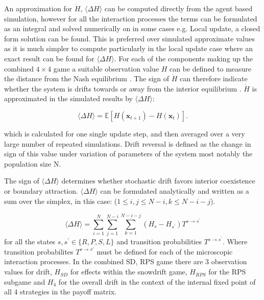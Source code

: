 \documentclass[%
 reprint,
 amsmath,amssymb,
 aps,
]{revtex4-2}
\begin{document}
An approximation for $\dot{H}$, $\langle \Delta H \rangle$ can be computed directly from the 
agent based simulation, however for all the interaction processes the terms can be 
formulated as an integral and solved numerically on in some cases e.g. Local update, a 
closed form solution can be found. This is preferred over simulated approximate values as it is much 
simpler to compute particularly in the local update case where an exact result can be found 
for $\langle \Delta H \rangle$. 
For each of the components making up the combined $4 \times 4$ game a suitable observation
value $H$ can be defined to measure the distance from the Nash equilibrium 
\cite{drift_reversal_paper,rps_cyclic_jens}. The sign of $\dot{H}$ can therefore
indicate whether the system is drifts towards or away from the interior equilibrium \cite{drift_reversal_paper}.
$\dot{H}$ is approximated in the simulated results by $\langle \Delta H \rangle$:

\begin{equation}
\langle \Delta H \rangle = \mathbb{E}[H(\mathbf{x}_{t+1}) - H(\mathbf{x}_t)].
\end{equation}

which is calculated for one single update step, and then averaged over a very large number of 
repeated simulations. Drift reversal is defined as the change in sign of this value under
variation of parameters of the system most notably the population size N. 

The sign of $\langle \Delta H \rangle$ determines whether stochastic drift favors interior coexistence or boundary attraction.
$\langle \Delta H \rangle$ can be formulated analytically \cite{rps_cyclic_jens} and
written as a sum over the simplex, in this case:
($1 \le i, j \le N -i, k \le N - i - j$).

\begin{equation}
\langle \Delta H \rangle = \sum_{i=1}^{N} \sum_{j=1}^{N-i} 
\sum_{k=1}^{N-i-j} \left(H_{s} - H_{s^\prime}\right)T^{s
\rightarrow s^\prime}
\end{equation}
for all the states $s, s^\prime \in \{R, P, S, L\}$ and transition probabilities $T^{s \rightarrow s^\prime}$.
Where transition probabilites $T^{s \rightarrow s'}$ must be defined for each of the 
microscopic interaction processes. In the combined SD, RPS game there are 3 observation values
for drift, $H_{SD}$ for effects within the snowdrift game, $H_{RPS}$ for the RPS subgame and 
$H_4$ for the overall drift in the context of the internal fixed point of all 4 strategies in the 
payoff matrix. 
\end{document}
